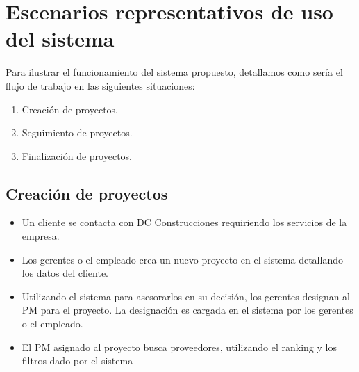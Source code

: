 \section{Escenarios representativos de uso del sistema}
Para ilustrar el funcionamiento del sistema propuesto, detallamos como sería el flujo de trabajo en las siguientes situaciones:
\begin{enumerate}
    \item Creación de proyectos.
    \item Seguimiento de proyectos.
    \item Finalización de proyectos.
\end{enumerate}

\subsection{Creación de proyectos}
\begin{itemize}
    \item Un cliente se contacta con DC Construcciones requiriendo los servicios de la empresa.
    \item Los gerentes o el empleado crea un nuevo proyecto en el sistema detallando los datos del cliente.
    \item Utilizando el sistema para asesorarlos en su decisión, los gerentes designan al PM para el proyecto. La designación es cargada en el sistema por los gerentes o el empleado.
    \item El PM asignado al proyecto busca proveedores, utilizando el ranking y los filtros dado por el sistema    
\end{itemize}